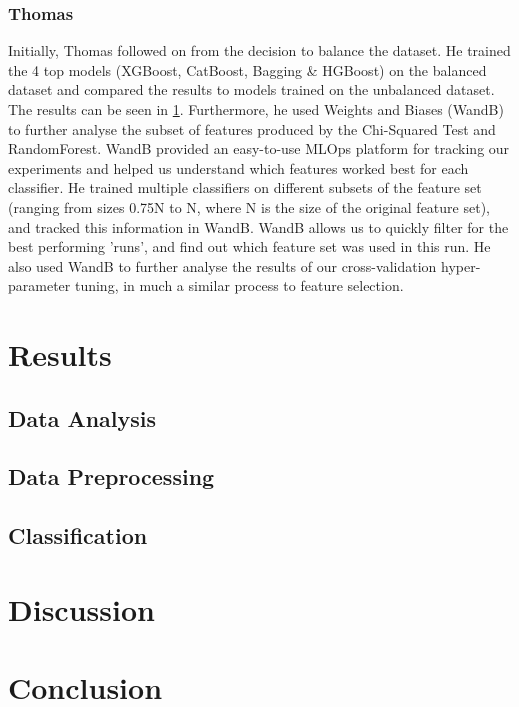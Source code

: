 \documentclass[conference]{IEEEtran}
\begin{document}
\subsubsection{Thomas}

Initially, Thomas followed on from the decision to balance the dataset. He trained the 4 top models (XGBoost, CatBoost, Bagging \& HGBoost) on the balanced dataset and compared the results to models trained on the unbalanced dataset. The results can be seen in \ref{ref:results}. Furthermore, he used Weights and Biases (WandB) \cite{wandb} to further analyse the subset of features produced by the Chi-Squared Test and RandomForest.  WandB provided an easy-to-use MLOps platform for tracking our experiments and helped us understand which features worked best for each classifier. He trained multiple classifiers on different subsets of the feature set (ranging from sizes 0.75N to N, where N is the size of the original feature set), and tracked this information in WandB. WandB allows us to quickly filter for the best performing 'runs', and find out which feature set was used in this run. He also used WandB to further analyse the results of our cross-validation hyper-parameter tuning, in much a similar process to feature selection.

\section{Results} \label{ref:results}

\subsection{Data Analysis}

\subsection{Data Preprocessing}

\subsection{Classification}

\section{Discussion}

\section{Conclusion}



\end{document}
